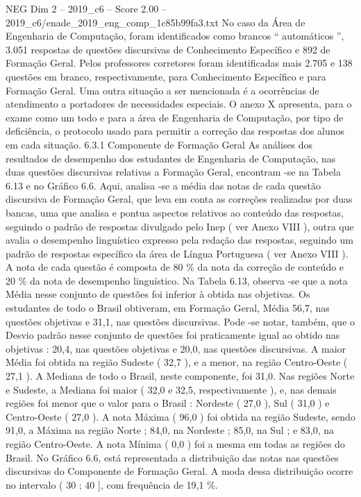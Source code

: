 \begin{textsample}{NEG Dim 2 – 2019\_c6 – Score 2.00 – 2019\_c6/enade\_2019\_eng\_comp\_1c85b99fa3.txt}
No caso da Área de Engenharia de Computação, foram identificados como brancos “ automáticos ”, 3.051 respostas de questões discursivas de Conhecimento Específico e 892 de Formação Geral.
Pelos professores corretores foram identificadas mais 2.705 e 138 questões em branco, respectivamente, para Conhecimento Específico e para Formação Geral.
Uma outra situação a ser mencionada é a ocorrências de atendimento a portadores de necessidades especiais.
O anexo X apresenta, para o exame como um todo e para a área de Engenharia de Computação, por tipo de deficiência, o protocolo usado para permitir a correção das respostas dos alunos em cada situação. 6.3.1 Componente de Formação Geral As análises dos resultados de desempenho dos estudantes de Engenharia de Computação, nas duas questões discursivas relativas a Formação Geral, encontram -se na Tabela 6.13 e no Gráfico 6.6.
Aqui, analisa -se a média das notas de cada questão discursiva de Formação Geral, que leva em conta as correções realizadas por duas bancas, uma que analisa e pontua aspectos relativos ao conteúdo das respostas, seguindo o padrão de respostas divulgado pelo Inep ( ver Anexo VIII ), outra que avalia o desempenho linguístico expresso pela redação das respostas, seguindo um padrão de respostas específico da área de Língua Portuguesa ( ver Anexo VIII ).
A nota de cada questão é composta de 80 \% da nota da correção de conteúdo e 20 \% da nota de desempenho linguístico.
Na Tabela 6.13, observa -se que a nota Média nesse conjunto de questões foi inferior à obtida nas objetivas.
Os estudantes de todo o Brasil obtiveram, em Formação Geral, Média 56,7, nas questões objetivas e 31,1, nas questões discursivas.
Pode -se notar, também, que o Desvio padrão nesse conjunto de questões foi praticamente igual ao obtido nas objetivas : 20,4, nas questões objetivas e 20,0, nas questões discursivas.
A maior Média foi obtida na região Sudeste ( 32,7 ), e a menor, na região Centro-Oeste ( 27,1 ).
A Mediana de todo o Brasil, neste componente, foi 31,0.
Nas regiões Norte e Sudeste, a Mediana foi maior ( 32,0 e 32,5, respectivamente ), e, nas demais regiões foi menor que o valor para o Brasil : Nordeste ( 27,0 ), Sul ( 31,0 ) e Centro-Oeste ( 27,0 ).
A nota Máxima ( 96,0 ) foi obtida na região Sudeste, sendo 91,0, a Máxima na região Norte ; 84,0, na Nordeste ; 85,0, na Sul ; e 83,0, na região Centro-Oeste.
A nota Mínima ( 0,0 ) foi a mesma em todas as regiões do Brasil.
No Gráfico 6.6, está representada a distribuição das notas nas questões discursivas do Componente de Formação Geral.
A moda dessa distribuição ocorre no intervalo ( 30 ; 40 ], com frequência de 19,1 \%.

\end{textsample}
